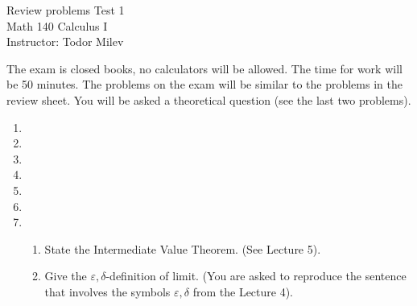 \documentclass{article}
\begin{document}
\begin{center}
\Large
Review problems Test 1\\ Math 140 Calculus I \\ \normalsize Instructor: Todor Milev
\end{center}


\noindent The exam is closed books, no calculators will be allowed. The time for work will be 50 minutes. The problems on the exam will be similar to the problems in the review sheet. You will be asked a theoretical question (see the last two problems).

\begin{enumerate}
\item 
\item 
\item 


\item 
\item 
\item 
\item 
\begin{enumerate}
\item State the Intermediate Value Theorem. (See Lecture 5).
\item Give the $\varepsilon,\delta$-definition of limit. (You are asked to reproduce the sentence that involves the symbols $\varepsilon,\delta$ from the Lecture 4).
\end{enumerate}
\end{enumerate}
\end{document}
